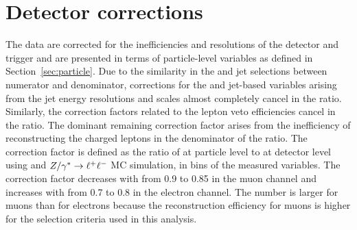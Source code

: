 \documentclass[cernpreprint,txfonts,UKenglish,texlive=2016]{\ATLASLATEXPATH atlasdoc}
\begin{document}
\section{Detector corrections}
\label{sec:corrections}
The data are corrected for the inefficiencies and resolutions of the
detector and trigger and are presented in terms of particle-level variables as defined in Section~\ref{sec:particle}.
Due to the similarity in the \ptmiss{} and jet selections between
numerator and denominator, corrections for the \ptmiss{} and jet-based variables arising from the jet
energy resolutions and scales
almost completely cancel in the ratio. 
Similarly, the correction factors related to the lepton veto
efficiencies cancel in the ratio.
The dominant remaining correction
factor arises from the inefficiency of reconstructing the charged leptons in
the denominator of the ratio.
The correction factor is defined as the ratio of \Rmiss{} at particle level 
to \Rmiss{} at detector level using \Znunu{} and $Z/\gamma^{*} \to \ell^{+}\ell^{-}$ MC simulation,
in bins of the measured variables. 
The correction factor decreases with \ptmiss{} from 0.9 to 0.85 in
the muon channel and increases with \ptmiss{} from 0.7 to
0.8 in the electron channel. The number is larger for muons than
for electrons because the reconstruction efficiency for muons is higher 
for the selection criteria used in this analysis.
\end{document}
